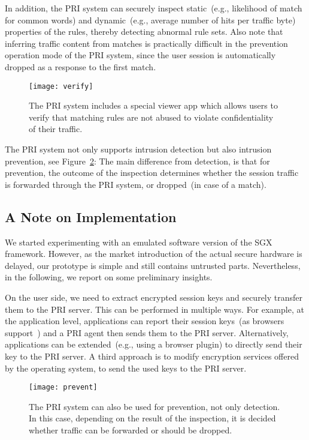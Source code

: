 \documentclass{sig-alternate-10pt}
\newcommand{\sys}{PRI\xspace}
\begin{document}
In addition, the \sys system can securely 
inspect static~(e.g., likelihood of match for 
common words) and dynamic~(e.g., average number of hits per traffic byte) 
properties of the rules, 
thereby detecting abnormal rule sets.
Also note that inferring traffic content from matches is practically 
difficult in the prevention operation mode of the \sys system, 
since the user session is automatically dropped as a response to the first match.

\begin{figure}[t!]
\centering
\texttt{[image: verify]}
\caption{The \sys system includes a special viewer app which allows users to verify that matching rules are not abused to violate confidentiality of their traffic.}\label{fig:fig3}
\end{figure}

The \sys system not only supports intrusion detection but also intrusion prevention,
see Figure~\ref{fig:fig4}: 
The main difference from detection, is that for prevention, 
the outcome of the inspection determines whether the session traffic is 
forwarded through the \sys system, or dropped~(in case of a match).

\subsection{A Note on Implementation}

We started
experimenting with an emulated software version of the SGX 
framework.
However, as the market introduction of the actual 
secure hardware is delayed, our prototype 
is simple and still contains untrusted parts.
Nevertheless, in the following, we report on some preliminary insights.

On the user side, we need to extract encrypted session 
keys and securely transfer them to the \sys server. This can be 
performed in multiple ways.
For example, 
at the application level, applications can report their 
session keys~(as browsers support~\cite{white}) and a \sys agent then 
sends them to the \sys server. Alternatively, applications 
can be extended~(e.g., using a browser plugin) to directly send their key 
to the \sys server.
A third approach is 
to modify 
encryption services offered 
by the operating system, to send the used keys to the \sys server. 


\begin{figure}[t!]
\centering
\texttt{[image: prevent]}
\caption{The \sys system can also be used for prevention, not only detection. In this case, depending on the result of the inspection, it is decided whether traffic can be forwarded or should be dropped.}\label{fig:fig4}
\end{figure}
\end{document}
